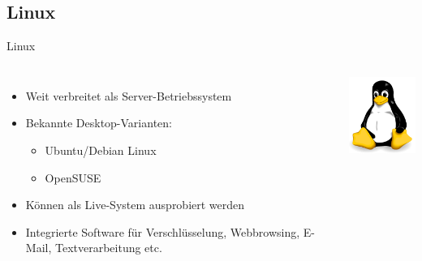 \documentclass[12pt]{beamer}
\begin{document}
\subsection{Linux}
\begin{frame}{Linux}

\begin{columns}


\column{8cm}
\begin{itemize}
\item Weit verbreitet als Server-Betriebssystem
\item Bekannte Desktop-Varianten: 

\begin{itemize}
\item Ubuntu/Debian Linux
\item OpenSUSE
\end{itemize}
\item Können als Live-System ausprobiert werden
\item Integrierte Software für Verschlüsselung, Webbrowsing, E-Mail, Textverarbeitung
etc.
\end{itemize}

\column{6cm}


\begin{center}
\includegraphics[width=3cm]{img/Tux}
\par\end{center}

\end{columns}
\end{frame}
\end{document}
